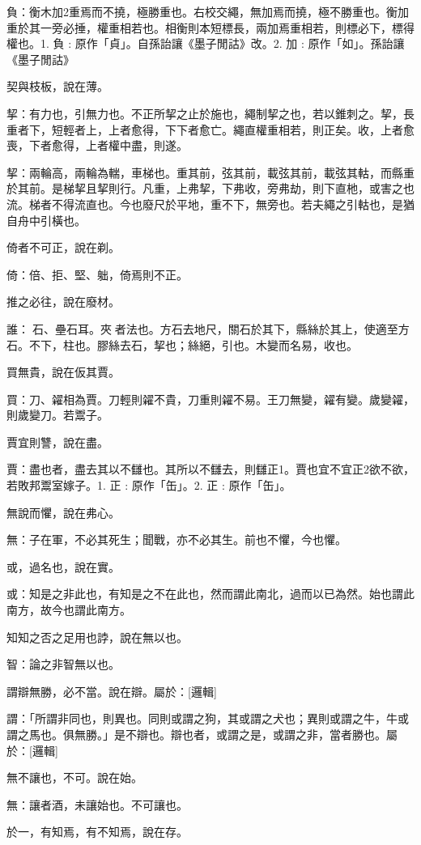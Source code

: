\begin{pinyinscope}
負：衡木加2重焉而不撓，極勝重也。右校交繩，無加焉而撓，極不勝重也。衡加重於其一旁必捶，權重相若也。相衡則本短標長，兩加焉重相若，則標必下，標得權也。1. 負 : 原作「貞」。自孫詒讓《墨子閒詁》改。2. 加 : 原作「如」。孫詒讓《墨子閒詁》

契與枝板，說在薄。

挈：有力也，引無力也。不正所挈之止於施也，繩制挈之也，若以錐刺之。挈，長重者下，短輕者上，上者愈得，下下者愈亡。繩直權重相若，則正矣。收，上者愈喪，下者愈得，上者權中盡，則遂。

挈：兩輪高，兩輪為輲，車梯也。重其前，弦其前，載弦其前，載弦其軲，而縣重於其前。是梯挈且挈則行。凡重，上弗挈，下弗收，旁弗劫，則下直杝，或害之也流。梯者不得流直也。今也廢尺於平地，重不下，無旁也。若夫繩之引軲也，是猶自舟中引橫也。

倚者不可正，說在剃。

倚：倍、拒、堅、䠳，倚焉則不正。

推之必往，說在廢材。

誰：𥩵石、壘石耳。夾𡨦者法也。方石去地尺，關石於其下，縣絲於其上，使適至方石。不下，柱也。膠絲去石，挈也；絲絕，引也。木變而名易，收也。

買無貴，說在仮其賈。

買：刀、糴相為賈。刀輕則糴不貴，刀重則糴不易。王刀無變，糴有變。歲變糴，則歲變刀。若鬻子。

賈宜則讐，說在盡。

賈：盡也者，盡去其以不讎也。其所以不讎去，則讎正1。賈也宜不宜正2欲不欲，若敗邦鬻室嫁子。1. 正 : 原作「缶」。2. 正 : 原作「缶」。

無說而懼，說在弗心。

無：子在軍，不必其死生；聞戰，亦不必其生。前也不懼，今也懼。

或，過名也，說在實。

或：知是之非此也，有知是之不在此也，然而謂此南北，過而以已為然。始也謂此南方，故今也謂此南方。

知知之否之足用也誖，說在無以也。

智：論之非智無以也。

謂辯無勝，必不當。說在辯。屬於：[邏輯]

謂：「所謂非同也，則異也。同則或謂之狗，其或謂之犬也；異則或謂之牛，牛或謂之馬也。俱無勝。」是不辯也。辯也者，或謂之是，或謂之非，當者勝也。屬於：[邏輯]

無不讓也，不可。說在始。

無：讓者酒，未讓始也。不可讓也。

於一，有知焉，有不知焉，說在存。


\end{pinyinscope}
